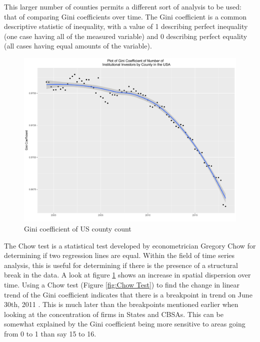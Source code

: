 This larger number of counties permits a different sort of analysis to be used: that of comparing Gini coefficients over time.  The Gini coefficient is a common descriptive statistic of inequality, with a value of 1 describing perfect inequality (one case having all of the measured variable) and 0 describing perfect equality (all cases having equal amounts of the variable). 

\begin{figure}[h]
	\centering
	\includegraphics[width=1\textwidth]{Figures/ChapterIII/GINI_County}
	\caption[Gini Coefficient of US County Count]{Gini coefficient of US county count}
	\label{fig:ginicounty}
\end{figure}
The Chow test is a statistical test developed by econometrician Gregory Chow for determining if two regression lines are equal.  Within the field of time series analysis, this is useful for determining if there is the presence of a structural break in the data.  	A look at figure \ref{fig:ginicounty} shows an increase in spatial dispersion over time.  Using a Chow test  (Figure \ref{fig:Chow Test}) to find the change in linear trend of the Gini coefficient indicates that there is a breakpoint in trend on June 30th, 2011  \citep{Chow1960}.  This is much later than the breakpoints mentioned earlier when looking at the concentration of firms in States and CBSAs. 	This can be somewhat explained by the Gini coefficient being more sensitive to areas going from 0 to 1 than say 15 to 16.  



